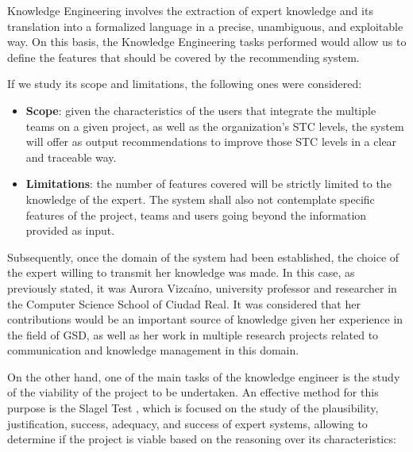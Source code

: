 Knowledge Engineering involves the extraction of expert knowledge and its translation into a formalized language in a precise, unambiguous, and exploitable way. On this basis, the Knowledge Engineering tasks performed would allow us to define the features that should be covered by the recommending system. 

If we study its scope and limitations, the following ones were considered:

\begin{itemize}
	\item \textbf{Scope}: given the characteristics of the users that integrate the multiple teams on a given project, as well as the organization's STC levels, the system will offer as output recommendations to improve those STC levels in a clear and traceable way.
	\item \textbf{Limitations}: the number of features covered will be strictly limited to the knowledge of the expert. The system shall also not contemplate specific features of the project, teams and users going beyond the information provided as input.
\end{itemize}

Subsequently, once the domain of the system had been established, the choice of the expert willing to transmit her knowledge was made. In this case, as previously stated, it was Aurora Vizcaíno, university professor and researcher in the Computer Science School of Ciudad Real. It was considered that her contributions would be an important source of knowledge given her experience in the field of GSD, as well as her work in multiple research projects related to communication and knowledge management in this domain.

On the other hand, one of the main tasks of the knowledge engineer is the study of the viability of the project to be undertaken. An effective method for this purpose is the Slagel Test \cite{mate_1998}, which is focused on the study of the plausibility, justification, success, adequacy, and success of expert systems, allowing to determine if the project is viable based on the reasoning over its characteristics:

